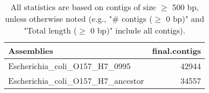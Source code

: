 \documentclass[12pt,a4paper]{article}
\begin{document}
\begin{table}[ht]
\begin{center}
\caption{All statistics are based on contigs of size $\geq$ 500 bp, unless otherwise noted (e.g., "\# contigs ($\geq$ 0 bp)" and "Total length ($\geq$ 0 bp)" include all contigs).}
\begin{tabular}{|l*{1}{|r}|}
\hline
Assemblies & final.contigs \\ \hline
Escherichia\_coli\_O157\_H7\_0995 & 42944 \\ \hline
Escherichia\_coli\_O157\_H7\_ancestor & 34557 \\ \hline
\end{tabular}
\end{center}
\end{table}
\end{document}
